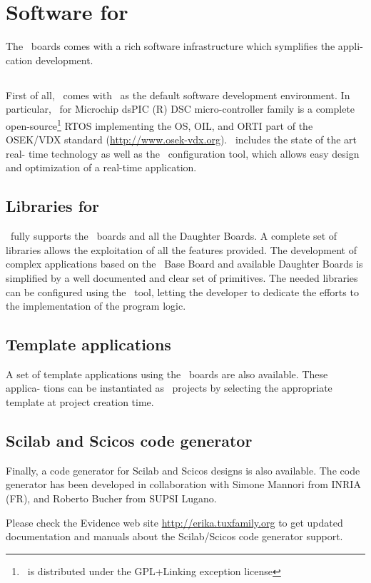 \chapter{Software for \flex}
\label{ch:software}
The \flex\ boards comes with a rich software infrastructure which symplifies the appli-
cation development.

\section{\ee}
First of all, \flex\ comes with \ee\ as the default software
development environment. In particular, \ee\ for Microchip dsPIC (R)
DSC micro-controller family is a complete open-source\footnote{\ee\ is
distributed under the GPL+Linking exception license} RTOS implementing
the OS, OIL, and ORTI part of the OSEK/VDX standard
(\url{http://www.osek-vdx.org}). \ee\ includes the state of the art
real- time technology as well as the \rtd\ configuration tool, which
allows easy design and optimization of a real-time application.

\section{Libraries for \flex}
\ee\ fully supports the \flex\ boards and all the
Daughter Boards. A complete set of libraries allows the exploitation
of all the features provided. The development of complex applications
based on the \flex\ Base Board and available Daughter Boards is
simplified by a well documented and clear set of primitives.  The
needed libraries can be configured using the \rtd\ tool, letting the
developer to dedicate the efforts to the implementation of the program
logic.

\section{Template applications}
A set of template applications using the \flex\ boards are also
available. These applica- tions can be instantiated as \rtd\ projects
by selecting the appropriate template at project creation time.

\section{Scilab and Scicos code generator}
Finally, a code generator for Scilab and Scicos designs is also
available. The code generator has been developed in collaboration
with Simone Mannori from INRIA (FR), and Roberto Bucher from SUPSI
Lugano. 

Please check the Evidence web site
\url{http://erika.tuxfamily.org} to get updated documentation and
manuals about the Scilab/Scicos code generator support.

